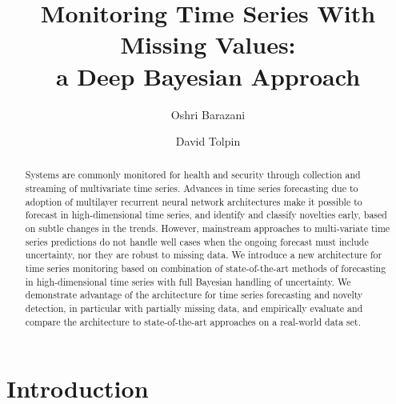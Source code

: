 \documentclass[runningheads]{llncs}
\begin{document}
\title{Monitoring Time Series With Missing Values:\\a Deep Bayesian Approach}

\author{Oshri Barazani \and David Tolpin}


\maketitle

\begin{abstract}
Systems are commonly monitored for health and security through collection and
streaming of multivariate time series. Advances in time series forecasting due
to adoption of multilayer recurrent neural network architectures make it
possible to forecast in high-dimensional time series, and identify and classify
novelties early, based on subtle changes in the trends. However, mainstream
approaches to multi-variate time series predictions do not handle well cases
when the ongoing forecast must include uncertainty, nor they are robust to
missing data. We introduce a new architecture for time series monitoring based
on combination of state-of-the-art methods of forecasting in high-dimensional
time series with full Bayesian handling of uncertainty. We demonstrate
advantage of the architecture for time series forecasting and novelty
detection, in particular with partially missing data, and empirically evaluate
and compare the architecture to state-of-the-art approaches on a real-world
data set.
\end{abstract}



\section{Introduction}
\end{document}
